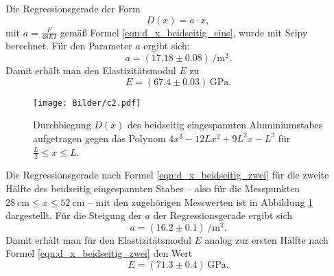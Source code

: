 Die Regressionsgerade der Form
\begin{equation*}
	D(x) = a \cdot x \mathrm{,}
\end{equation*}
mit $a = \frac{F}{48EI}$ gemäß Formel \eqref{eqn:d_x_beidseitig_eins}, wurde mit Scipy
\cite{scipy} berechnet.
Für den Parameter $a$ ergibt sich:
\begin{equation*}
	a = (17.18 \pm 0.08) \, \si{\per\square\meter} \mathrm{.}
\end{equation*}
Damit erhält man den Elastizitätsmodul $E$ zu
\begin{equation*}
	E = (67.4 \pm 0.03) \, \si{\giga\pascal} \mathrm{.}
\end{equation*}
\begin{figure}
	\centering
	\texttt{[image: Bilder/c2.pdf]}
	\caption{Durchbiegung $D(x)$ des beidseitig eingespannten Aluminiumstabes aufgetragen gegen das Polynom $4x^3 - 12Lx^2 + 9L^2x - L^3$ für $\frac{L}{2} \leq x \leq L$.}
	\label{fig:StabusMaximus}
\end{figure}

Die Regressionsgerade nach Formel \eqref{eqn:d_x_beidseitig_zwei} für die zweite Hälfte
des beidseitig eingespannten Stabes -- also für die
Messpunkten $\SI{28}{\centi\meter} \leq x \leq \SI{52}{\centi\meter}$ --  mit den
zugehörigen Messwerten ist in Abbildung \ref{fig:StabusMaximus} dargestellt.
Für die Steigung der $a$ der Regressionsgerade ergibt sich
\begin{equation*}
	a = (16.2\pm 0.1)\,\si{\per\square\meter}  \mathrm{.}
\end{equation*}
Damit erhält man für den Elastizitätsmodul $E$ analog zur ersten Hälfte nach Formel
\eqref{eqn:d_x_beidseitig_zwei} den Wert
\begin{equation*}
	E =(71.3 \pm 0.4) \, \si{\giga\pascal} \mathrm{.}
\end{equation*}
